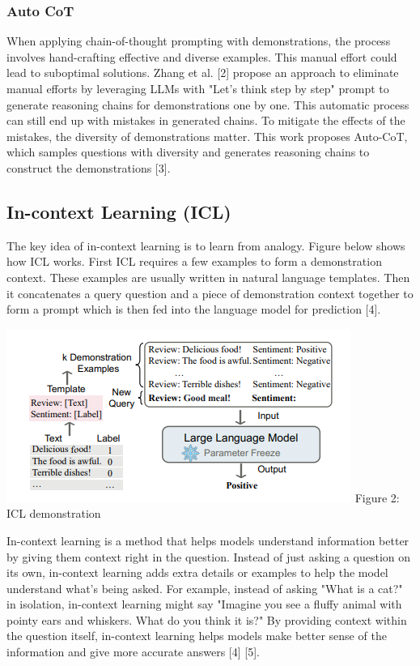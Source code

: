 \documentclass{article}
\begin{document}
\subsubsection{Auto CoT}
When applying chain-of-thought prompting with demonstrations, the process involves hand-crafting effective and diverse examples. This manual effort could lead to suboptimal solutions. Zhang et al. [2] propose an approach to eliminate manual efforts by leveraging LLMs with "Let's think step by step" prompt to generate reasoning chains for demonstrations one by one. This automatic process can still end up with mistakes in generated chains. To mitigate the effects of the mistakes, the diversity of demonstrations matter. This work proposes Auto-CoT, which samples questions with diversity and generates reasoning chains to construct the demonstrations [3]. 

\subsection{In-context Learning (ICL)}

The key idea of in-context learning is to learn from analogy. Figure below shows how ICL works. First ICL requires a few examples to form a demonstration context. These examples are usually written in natural language templates. Then it concatenates a query question and a piece of demonstration context together to form a prompt which is then fed into the language model for prediction [4]. 

\begin{center}
    \includegraphics[]{icl.png}
    Figure 2: ICL demonstration
\end{center}
In-context learning is a method that helps models understand information better by giving them context right in the question. Instead of just asking a question on its own, in-context learning adds extra details or examples to help the model understand what's being asked. For example, instead of asking "What is a cat?" in isolation, in-context learning might say "Imagine you see a fluffy animal with pointy ears and whiskers. What do you think it is?" By providing context within the question itself, in-context learning helps models make better sense of the information and give more accurate answers [4] [5].
\end{document}

